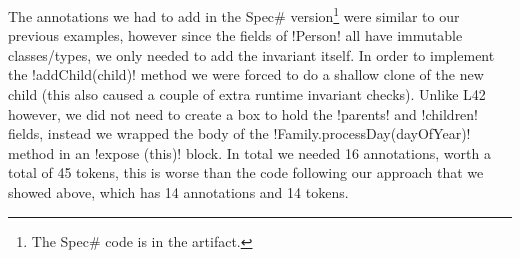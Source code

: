 





The annotations we had to add in the Spec\# version\footnote{The Spec\# code is in the artifact.} were similar to our previous examples, however since the fields of \Q!Person! all have immutable classes/types, we only needed to add the invariant itself. In order to implement the \Q!addChild(child)! method we were forced to do a shallow clone of the new child (this also caused a couple of extra runtime invariant checks). Unlike L42 however, we did not need to create a box to hold the \Q!parents! and \Q!children! fields, instead we wrapped the body of the \Q!Family.processDay(dayOfYear)! method in an \Q!expose (this)! block. In total we needed 16 annotations, worth a total of 45 tokens, this is worse than the code following our approach that we showed above, which has 14 annotations and 14 tokens.


